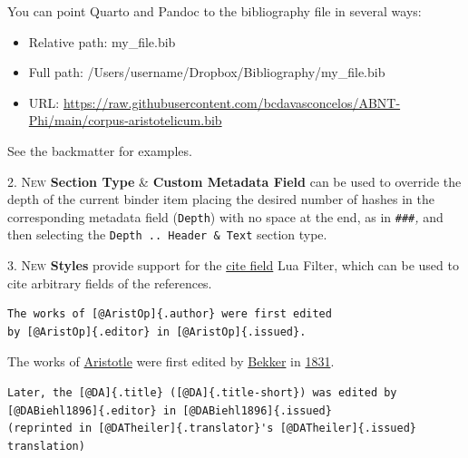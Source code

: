 \documentclass[
  12pt,
  a4paper,
  oneside]{scrbook}
\providecommand{\tightlist}{%
  \setlength{\itemsep}{0pt}\setlength{\parskip}{0pt}}\usepackage{longtable,booktabs,array}
\begin{document}
\begin{tcolorbox}[enhanced jigsaw, bottomtitle=1mm, left=2mm, colframe=quarto-callout-important-color-frame, colback=white, bottomrule=.15mm, title=\textcolor{quarto-callout-important-color}{\faExclamation}\hspace{0.5em}{Important}, toprule=.15mm, toptitle=1mm, titlerule=0mm, opacitybacktitle=0.6, leftrule=.75mm, rightrule=.15mm, breakable, colbacktitle=quarto-callout-important-color!10!white, arc=.35mm, opacityback=0, coltitle=black]

You can point Quarto and Pandoc to the bibliography file in several
ways:

\begin{itemize}
\tightlist
\item
  Relative path: my\_file.bib
\item
  Full path: /Users/username/Dropbox/Bibliography/my\_file.bib
\item
  URL:
  \url{https://raw.githubusercontent.com/bcdavasconcelos/ABNT-Phi/main/corpus-aristotelicum.bib}
\end{itemize}

\end{tcolorbox}

See the backmatter for examples.

\textsc{2. New} \textbf{Section Type} \& \textbf{Custom Metadata Field}
can be used to override the depth of the current binder item placing the
desired number of hashes in the corresponding metadata field
(\texttt{Depth}) with no space at the end, as in \texttt{\#\#\#}\emph{,}
and then selecting the \texttt{Depth\ ..\ Header\ \&\ Text} section
type.

\textsc{3. New} \textbf{Styles} provide support for the
\href{https://github.com/bcdavasconcelos/citefield}{cite field} Lua
Filter, which can be used to cite arbitrary fields of the references.

\begin{verbatim}
The works of [@AristOp]{.author} were first edited 
by [@AristOp]{.editor} in [@AristOp]{.issued}.  
\end{verbatim}

The works of
\protect\hypertarget{cite_37}{}{\label{cite_37}\protect\hyperlink{ref-AristOp}{Aristotle}}
were first edited by
\protect\hypertarget{cite_38}{}{\label{cite_38}\protect\hyperlink{ref-AristOp}{Bekker}}
in
\protect\hypertarget{cite_39}{}{\label{cite_39}\protect\hyperlink{ref-AristOp}{1831}}.

\begin{verbatim}
Later, the [@DA]{.title} ([@DA]{.title-short}) was edited by 
[@DABiehl1896]{.editor} in [@DABiehl1896]{.issued} 
(reprinted in [@DATheiler]{.translator}'s [@DATheiler]{.issued} translation)
\end{verbatim}
\end{document}

